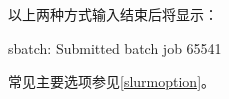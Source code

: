 以上两种方式输入结束后将显示：
\begin{OUT}
sbatch: Submitted batch job 65541
\end{OUT}

常见主要选项参见\ref{slurmoption}。%

